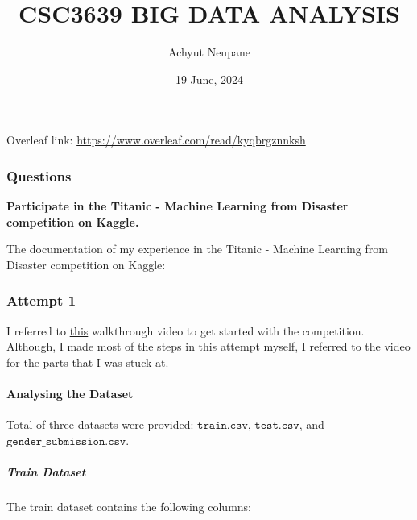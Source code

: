 \documentclass{exam}
\title{CSC3639 BIG DATA ANALYSIS}
\author{Achyut Neupane}
\date{19 June, 2024}
\begin{document}
    \maketitle

    \part*{}

    Overleaf link: \href{https://www.overleaf.com/read/kyqbrgznnksh}{https://www.overleaf.com/read/kyqbrgznnksh}

    \section*{Questions}
    \begin{questions}

        \question \textbf{Participate in the Titanic - Machine Learning from Disaster competition on Kaggle.}

        \begin{TheSolution}

        The documentation of my experience in the Titanic - Machine Learning from Disaster competition on Kaggle:

        \section{Attempt 1}

        I referred to \href{https://youtu.be/I3FBJdiExcg}{this} walkthrough video to get started with the competition. Although, I made most of the steps in this attempt myself, I referred to the video for the parts that I was stuck at.

        \subsection{Analysing the Dataset}

        Total of three datasets were provided: $\texttt{train.csv}$, $\texttt{test.csv}$, and $\texttt{gender\_submission.csv}$.

        \subsubsection{Train Dataset}

        The train dataset contains the following columns:


\end{TheSolution}
\end{questions}
\end{document}
